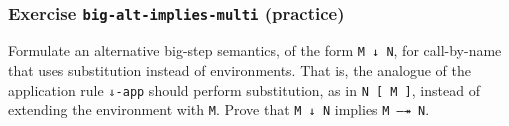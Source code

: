\begin{fence}
\begin{code}
\AgdaSpace{}%
\AgdaOperator{\AgdaInductiveConstructor{,}}\AgdaSpace{}%
\AgdaSpace{}%
\AgdaSpace{}%
\AgdaOperator{\AgdaInductiveConstructor{,}}\AgdaSpace{}%
\AgdaSpace{}%
\AgdaSpace{}%
\AgdaOperator{\AgdaInductiveConstructor{,}}\AgdaSpace{}%
\AgdaSpace{}%
\AgdaSpace{}%
\AgdaOperator{\AgdaInductiveConstructor{,}}\AgdaSpace{}%
\AgdaSpace{}%
\AgdaSpace{}%
\AgdaSpace{}%
\AgdaSpace{}%
\AgdaSpace{}%
\AgdaSpace{}%
\AgdaSymbol{\{}\AgdaSpace{}%
\AgdaSymbol{=}\AgdaSpace{}%
\AgdaSymbol{\}}\AgdaSpace{}%
\AgdaSymbol{|}\AgdaSpace{}%
\AgdaSpace{}%
\AgdaSymbol{=}\<%
\\
\>[.][@{}l@{}]\<[811I]%
\>[6]\AgdaSpace{}%
\AgdaSpace{}%
\AgdaSymbol{(}\AgdaSpace{}%
\AgdaSymbol{)}\AgdaSpace{}%
\AgdaSpace{}%
\AgdaOperator{\AgdaInductiveConstructor{,}}\AgdaSpace{}%
\AgdaSpace{}%
\<%
\end{code}
\end{fence}

\hypertarget{exercise-big-alt-implies-multi-practice}{%
\subsubsection{\texorpdfstring{Exercise \texttt{big-alt-implies-multi}
(practice)}{Exercise big-alt-implies-multi (practice)}}\label{exercise-big-alt-implies-multi-practice}}

Formulate an alternative big-step semantics, of the form
\texttt{M\ ↓\ N}, for call-by-name that uses substitution instead of
environments. That is, the analogue of the application rule
\texttt{⇓-app} should perform substitution, as in
\texttt{N\ {[}\ M\ {]}}, instead of extending the environment with
\texttt{M}. Prove that \texttt{M\ ↓\ N} implies \texttt{M\ —↠\ N}.

\begin{fence}
\begin{code}%
\>[0]\<%
\end{code}
\end{fence}

